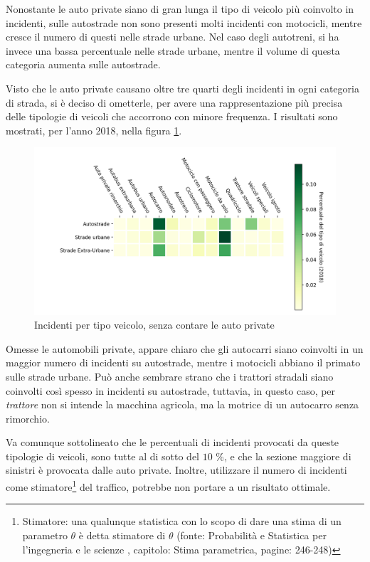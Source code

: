 \documentclass[a4paper,12pt]{report}
\newcommand{\quotestyle}[1]{\textit{#1}}
\begin{document}
Nonostante le auto private siano di gran lunga il tipo di veicolo 
più coinvolto in incidenti, sulle autostrade non sono presenti molti incidenti con motocicli, 
mentre cresce il numero di questi nelle strade urbane. 
Nel caso degli autotreni, si ha invece una bassa percentuale nelle strade 
urbane, mentre il volume di questa categoria aumenta sulle autostrade. 

Visto che le auto private causano oltre tre quarti degli 
incidenti in ogni categoria di strada,  
si è deciso di ometterle, per avere una rappresentazione più 
precisa delle tipologie di veicoli che accorrono con minore frequenza. 
I risultati sono mostrati, per l'anno 2018, 
nella figura \ref{fig:differenza-strade-no-auto}. 

\begin{figure}
    \includegraphics[width=\linewidth]{../src/incidenti/incidenti_senza_coords/tipo_veicoli/differenza_senza_auto.png}
    \caption{Incidenti per tipo veicolo, senza contare le auto private}
    \label{fig:differenza-strade-no-auto}
\end{figure}

Omesse le automobili private, appare chiaro che gli autocarri siano coinvolti in un maggior 
numero di incidenti su autostrade, mentre i motocicli abbiano il primato sulle strade urbane. 
Può anche sembrare strano che i trattori stradali siano coinvolti così spesso in incidenti 
su autostrade, tuttavia, in questo caso, per \quotestyle{trattore} non si intende la macchina 
agricola, ma la motrice di un autocarro senza rimorchio. 

Va comunque sottolineato che le percentuali di incidenti provocati da queste tipologie di 
veicoli, sono tutte al di sotto del $10$ \%, e che la sezione maggiore di sinistri è 
provocata dalle auto private. 
Inoltre, utilizzare il numero di incidenti come 
stimatore\footnote{Stimatore: una qualunque statistica con 
lo scopo di dare una stima di un parametro $\theta$ è detta stimatore 
di $\theta$ (fonte: Probabilità e Statistica per l'ingegneria e 
le scienze \cite{PROB_E_STATISTICA:1}, capitolo: Stima parametrica, pagine: 246-248)} 
del traffico, potrebbe non portare a un risultato ottimale. 
\end{document}
